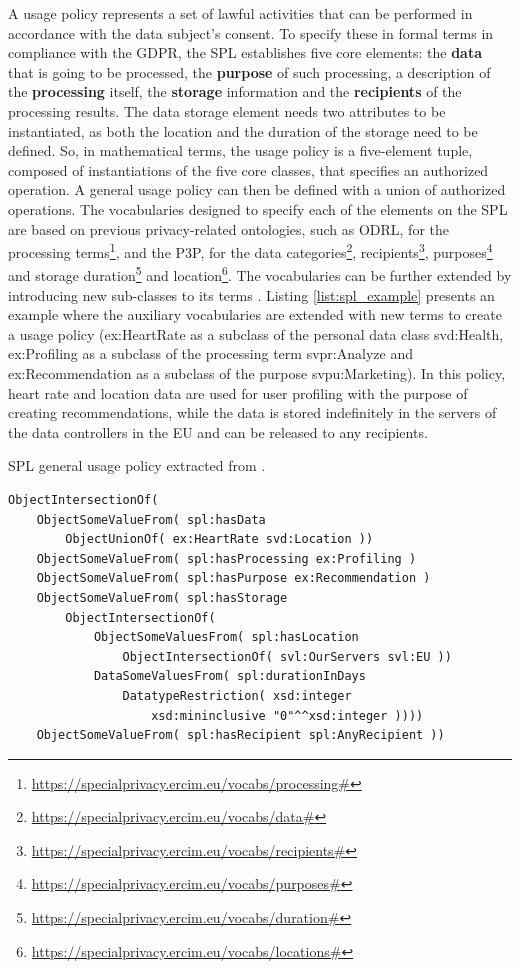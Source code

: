 A usage policy represents a set of lawful activities that can be performed in accordance with the data subject's consent.
To specify these in formal terms in compliance with the GDPR, the SPL establishes five core elements: the \textbf{data} that is going to be processed, the \textbf{purpose} of such processing, a description of the \textbf{processing} itself, the \textbf{storage} information and the \textbf{recipients} of the processing results.
The data storage element needs two attributes to be instantiated, as both the location and the duration of the storage need to be defined.
So, in mathematical terms, the usage policy is a five-element tuple, composed of instantiations of the five core classes, that specifies an authorized operation.
A general usage policy can then be defined with a union of authorized operations.
The vocabularies designed to specify each of the elements on the SPL are based on previous privacy-related ontologies, such as ODRL, for the processing terms\footnote{\url{https://specialprivacy.ercim.eu/vocabs/processing\#}}, and the P3P, for the data categories\footnote{\url{https://specialprivacy.ercim.eu/vocabs/data\#}}, recipients\footnote{\url{https://specialprivacy.ercim.eu/vocabs/recipients\#}}, purposes\footnote{\url{https://specialprivacy.ercim.eu/vocabs/purposes\#}} and storage duration\footnote{\url{https://specialprivacy.ercim.eu/vocabs/duration\#}} and location\footnote{\url{https://specialprivacy.ercim.eu/vocabs/locations\#}}.
The vocabularies can be further extended by introducing new sub-classes to its terms \citep{bonatti_policy_2018}.
Listing \ref{list:spl_example} presents an example where the auxiliary vocabularies are extended with new terms to create a usage policy (ex:HeartRate as a subclass of the personal data class svd:Health, ex:Profiling as a subclass of the processing term svpr:Analyze and ex:Recommendation as a subclass of the purpose svpu:Marketing). In this policy, heart rate and location data are used for user profiling with the purpose of creating recommendations, while the data is stored indefinitely in the servers of the data controllers in the EU and can be released to any recipients.

\begin{listing}
\caption{SPL general usage policy extracted from \cite{bonatti_special_2019}.}
\label{list:spl_example}
\begin{verbatim}
ObjectIntersectionOf(
    ObjectSomeValueFrom( spl:hasData
        ObjectUnionOf( ex:HeartRate svd:Location ))
    ObjectSomeValueFrom( spl:hasProcessing ex:Profiling )
    ObjectSomeValueFrom( spl:hasPurpose ex:Recommendation )
    ObjectSomeValueFrom( spl:hasStorage
        ObjectIntersectionOf(
            ObjectSomeValuesFrom( spl:hasLocation
                ObjectIntersectionOf( svl:OurServers svl:EU ))
            DataSomeValuesFrom( spl:durationInDays
                DatatypeRestriction( xsd:integer
                    xsd:mininclusive "0"^^xsd:integer ))))
    ObjectSomeValueFrom( spl:hasRecipient spl:AnyRecipient ))
\end{verbatim}
\end{listing}

